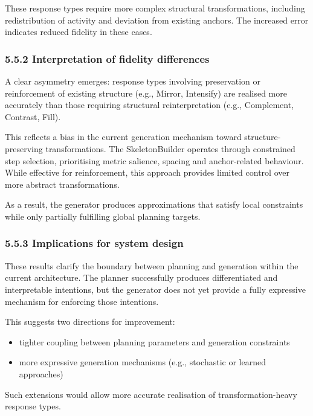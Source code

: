 These response types require more complex structural transformations,
including redistribution of activity and deviation from existing
anchors. The increased error indicates reduced fidelity in these cases.

\subsubsection{5.5.2 Interpretation of fidelity
differences}\label{interpretation-of-fidelity-differences}

A clear asymmetry emerges: response types involving preservation or
reinforcement of existing structure (e.g., Mirror, Intensify) are
realised more accurately than those requiring structural
reinterpretation (e.g., Complement, Contrast, Fill).

This reflects a bias in the current generation mechanism toward
structure-preserving transformations. The SkeletonBuilder operates
through constrained step selection, prioritising metric salience,
spacing and anchor-related behaviour. While effective for reinforcement,
this approach provides limited control over more abstract
transformations.

As a result, the generator produces approximations that satisfy local
constraints while only partially fulfilling global planning targets.

\subsubsection{5.5.3 Implications for system
design}\label{implications-for-system-design}

These results clarify the boundary between planning and generation
within the current architecture. The planner successfully produces
differentiated and interpretable intentions, but the generator does not
yet provide a fully expressive mechanism for enforcing those intentions.

This suggests two directions for improvement:

\begin{itemize}
\item
  tighter coupling between planning parameters and generation
  constraints
\item
  more expressive generation mechanisms (e.g., stochastic or learned
  approaches)
\end{itemize}

Such extensions would allow more accurate realisation of
transformation-heavy response types.

